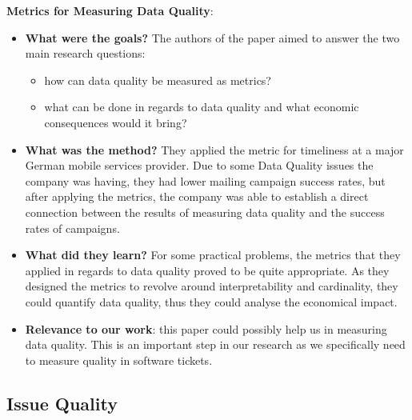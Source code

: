 \documentclass{mprop}
\begin{document}
\textbf{Metrics for Measuring Data Quality}\cite{Heinrich2007MetricsDataQuality}:
\begin{itemize}
  \item \textbf{What were the goals?}
    The authors of the paper aimed to answer the two main research questions:
      \begin{itemize}
        \item how can data quality be measured as metrics?
        \item what can be done in regards to data quality and what economic
          consequences would it bring?
      \end{itemize}
  \item \textbf{What was the method?}
    They applied the metric for timeliness at a major German mobile services
    provider. Due to some Data Quality issues the company was having, they had
    lower mailing campaign success rates, but after applying the metrics, the 
    company was able to establish a direct connection between the results of
    measuring data quality and the success rates of campaigns.
  \item \textbf{What did they learn?}
    For some practical problems, the metrics that they applied in regards to
    data quality proved to be quite appropriate. As they designed the metrics
    to revolve around interpretability and cardinality, they could quantify
    data quality, thus they could analyse the economical impact.
  \item \textbf{Relevance to our work}: this paper could possibly help us in
    measuring data quality. This is an important step in our research as we 
    specifically need to measure quality in software tickets.
\end{itemize}

\subsection{Issue Quality}
\end{document}
